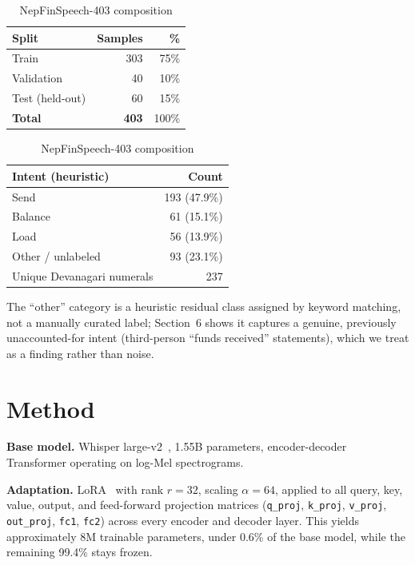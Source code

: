 \documentclass[11pt,a4paper]{article}
\begin{document}
\begin{table}[H]
\centering
\caption{NepFinSpeech-403 composition}
\label{tab:dataset}
\begin{tabular}{lrr}
\toprule
\textbf{Split} & \textbf{Samples} & \textbf{\%} \\
\midrule
Train & 303 & 75\% \\
Validation & 40 & 10\% \\
Test (held-out) & 60 & 15\% \\
\midrule
\textbf{Total} & \textbf{403} & 100\% \\
\bottomrule
\end{tabular}
\quad
\begin{tabular}{lr}
\toprule
\textbf{Intent (heuristic)} & \textbf{Count} \\
\midrule
Send & 193 (47.9\%) \\
Balance & 61 (15.1\%) \\
Load & 56 (13.9\%) \\
Other / unlabeled & 93 (23.1\%) \\
\midrule
Unique Devanagari numerals & 237 \\
\bottomrule
\end{tabular}
\end{table}

The ``other'' category is a heuristic residual class assigned by keyword
matching, not a manually curated label; Section~6 shows it captures a
genuine, previously unaccounted-for intent (third-person ``funds received''
statements), which we treat as a finding rather than noise.

\section{Method}

\textbf{Base model.} Whisper large-v2~\cite{radford2022}, 1.55B parameters,
encoder-decoder Transformer operating on log-Mel spectrograms.

\textbf{Adaptation.} LoRA~\cite{hu2022lora} with rank $r=32$, scaling
$\alpha=64$, applied to all query, key, value, output, and feed-forward
projection matrices (\texttt{q\_proj}, \texttt{k\_proj}, \texttt{v\_proj},
\texttt{out\_proj}, \texttt{fc1}, \texttt{fc2}) across every encoder and
decoder layer. This yields approximately 8M trainable parameters, under
0.6\% of the base model, while the remaining 99.4\% stays frozen.
\end{document}
